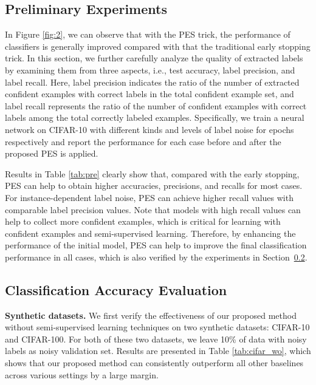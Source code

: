 \documentclass[11pt]{article}
\begin{document}
\subsection{Preliminary Experiments}
In Figure \ref{fig:2}, we can observe that with the PES trick, the performance of classifiers is generally improved compared with that the traditional early stopping trick. In this section, we further carefully analyze the quality of extracted labels by examining them from three aspects, i.e., test accuracy, label precision, and label recall. Here, label precision indicates the ratio of the number of extracted confident examples with correct labels in the total confident example set, and label recall represents the ratio of the number of confident examples with correct labels among the total correctly labeled examples. Specifically, we train a neural network on CIFAR-10  with different kinds and levels of label noise for  epochs respectively and report the performance for each case before and after the proposed PES is applied. 

Results in Table \ref{tab:pre} clearly show that, compared with the early stopping, PES can help to obtain higher accuracies, precisions, and recalls for most cases.  For instance-dependent label noise, PES can achieve higher recall values with comparable label precision values. Note that models with high recall values can help to collect more confident examples, which is critical for learning with confident examples and semi-supervised learning. Therefore, by enhancing the performance of the initial model, PES can help to improve the final classification performance in all cases, which is also verified by the experiments in Section~\ref{sec:3.3}. 

\subsection{Classification Accuracy Evaluation}
\label{sec:3.3}
\textbf{Synthetic datasets.}  We first verify the effectiveness of our proposed method without semi-supervised learning techniques on two synthetic datasets: CIFAR-10 and CIFAR-100. For both of these two datasets, we leave 10\% of data with noisy labels as noisy validation set. Results are presented in Table \ref{tab:cifar_wo}, which shows that our proposed  method can consistently outperform all other baselines across various settings by a large margin. 
\end{document}
